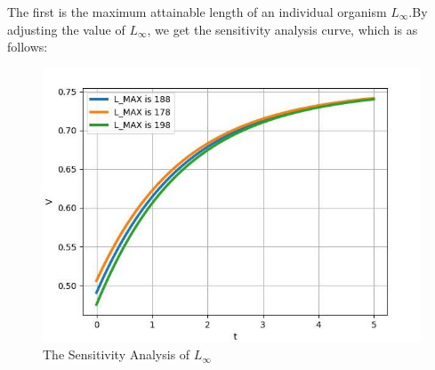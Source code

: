 \documentclass[12pt]{article}  %
\begin{document}
The first is the maximum attainable length of an individual organism $L_{\infty}$.By adjusting the value of $L_{\infty}$, we get the sensitivity analysis curve, which is as follows:
\vspace{-5cm}
\begin{figure}[H]  %
	\centering  %
	\includegraphics[width=.6\textwidth]{灵敏度分析.jpg} %
	\caption{The Sensitivity Analysis of $L_{\infty}$}
\end{figure}
\end{document}
